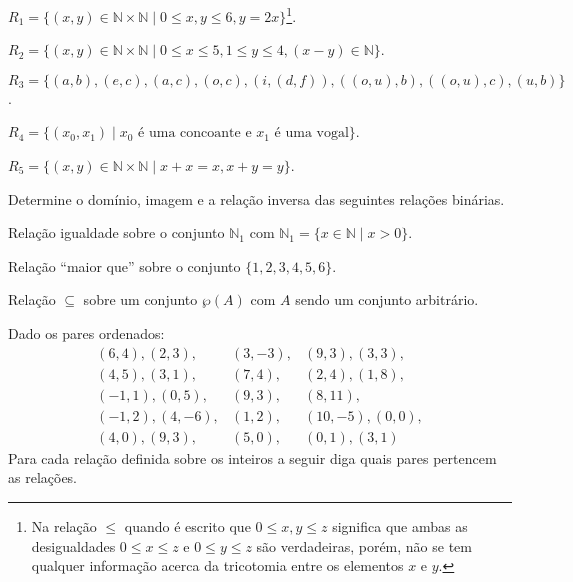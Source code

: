 \begin{exerList}
	\item $R_1 = \{(x, y) \in \mathbb{N} \times \mathbb{N} \mid 0 \leq x, y \leq 6, y = 2x\}$\footnote{Na relação $\leq$ quando é escrito que $0 \leq x, y \leq z$ significa que ambas as desigualdades $0 \leq x\leq z$ e $0 \leq y \leq z$ são verdadeiras, porém, não se tem qualquer informação acerca da tricotomia entre os elementos $x$ e $y$.}.
	\item $R_2 = \{(x, y) \in \mathbb{N} \times \mathbb{N} \mid 0 \leq x \leq 5, 1 \leq y \leq 4, (x-y) \in \mathbb{N} \}$.
	\item $R_3 = \{(a,b), (e, c), (a, c), (o, c), (i, (d,f)), ((o, u), b), ((o, u), c), (u, b) \}$.
	\item $R_4 = \{(x_0, x_1) \mid x_0 \text{ é uma concoante e } x_1 \text{ é uma vogal} \}$.
	\item $R_5 = \{(x, y) \in \mathbb{N} \times \mathbb{N} \mid x + x = x, x + y = y\}$.
\end{exerList}

\begin{questao}\label{prob:Relacoes6}
	Determine o domínio, imagem e a relação inversa das seguintes relações binárias.
\end{questao}

\begin{exerList}
	\item Relação igualdade sobre o conjunto $\mathbb{N}_1$ com $\mathbb{N}_1 = \{x \in \mathbb{N} \mid x > 0\}$. 
	\item Relação ``maior que'' sobre o conjunto $\{1,2,3,4,5,6\}$.
	\item Relação $\subseteq$ sobre um conjunto $\wp(A)$ com $A$ sendo um conjunto arbitrário.
\end{exerList}

\begin{questao}\label{prob:Relacoes7}
	Dado os pares ordenados: 
  \begin{eqnarray*}
    (6, 4), (2, 3),&(3, -3),& (9, 3), (3, 3),\\
    (4, 5), (3, 1),&(7, 4),& (2, 4), (1, 8),\\
    (-1, 1), (0, 5),&(9, 3),& (8, 11),\\
    (-1, 2), (4, -6),&(1, 2),& (10, -5), (0, 0),\\ 
    (4, 0),(9, 3),&(5, 0),& (0, 1), (3, 1)
  \end{eqnarray*}
  Para cada relação definida sobre os inteiros a seguir diga quais pares pertencem as relações.
\end{questao}

